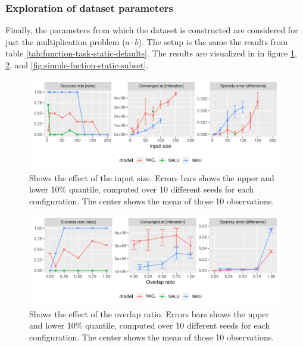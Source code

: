 

\subsubsection{Exploration of dataset parameters}

Finally, the parameters from which the dataset is constructed are considered for just the multiplication problem ($a \cdot b$). The setup is the same the results from table \ref{tab:function-task-static-defaults}. The results are visualized in in figure \ref{fig:simple-fnction-static-input-size}, \ref{fig:simple-fnction-static-overlap}, and \ref{fig:simple-fnction-static-subset}.

\begin{figure}[H]
\centering
\includegraphics[width=\linewidth]{results/simple_function_static_input_size.pdf}
\caption{Shows the effect of the input size. Errors bars shows the upper and lower 10\% quantile, computed over 10 different seeds for each configuration. The center shows the mean of those 10 observations.}
\label{fig:simple-fnction-static-input-size}
\end{figure}

\begin{figure}[H]
\centering
\includegraphics[width=\linewidth]{results/simple_function_static_overlap.pdf}
\caption{Shows the effect of the overlap ratio. Errors bars shows the upper and lower 10\% quantile, computed over 10 different seeds for each configuration. The center shows the mean of those 10 observations.}
\label{fig:simple-fnction-static-overlap}
\end{figure}

